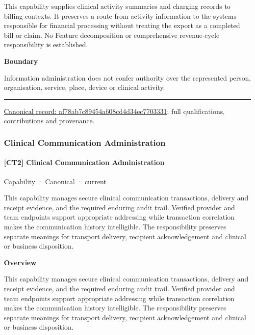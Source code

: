 This capability supplies clinical activity summaries and charging records to billing contexts. It preserves a route from activity information to the systems responsible for financial processing without treating the export as a completed bill or claim. No Feature decomposition or comprehensive revenue-cycle responsibility is established.



\textbf{Boundary}



Information administration does not confer authority over the represented person, organisation, service, place, device or clinical activity.



\medskip\hrule\medskip

{\footnotesize \href{../../../../continuum/strategy/capability/af78ab7c89454a608cd4d34ec7703331.md}{Canonical record: af78ab7c89454a608cd4d34ec7703331}; full qualifications, contributions and provenance.}\par
\subsubsection{Clinical Communication Administration}

\paragraph{[CT2] Clinical Communication Administration}

\label{element:b38f2c2811724734b5887b6dbaaabbfc}
{\small Capability · Canonical · current}\par

This capability manages secure clinical communication transactions, delivery and receipt evidence, and the required enduring audit trail. Verified provider and team endpoints support appropriate addressing while transaction correlation makes the communication history intelligible. The responsibility preserves separate meanings for transport delivery, recipient acknowledgement and clinical or business disposition.



\textbf{Overview}



This capability manages secure clinical communication transactions, delivery and receipt evidence, and the required enduring audit trail. Verified provider and team endpoints support appropriate addressing while transaction correlation makes the communication history intelligible. The responsibility preserves separate meanings for transport delivery, recipient acknowledgement and clinical or business disposition.



